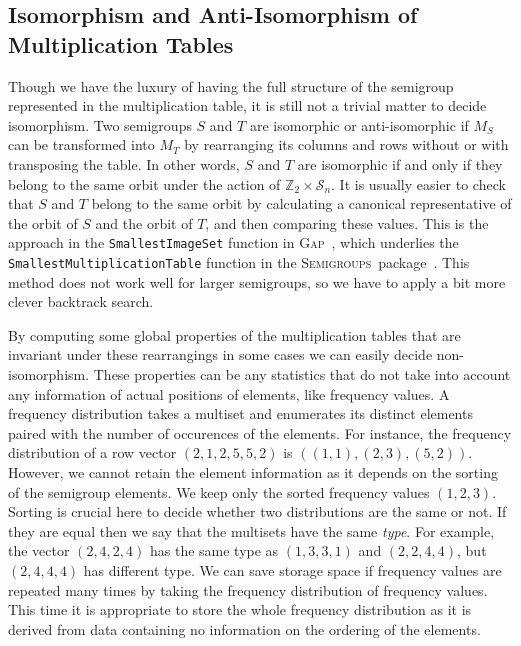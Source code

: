 \documentclass{amsart}
\newcommand{\cS}{{\mathcal S}}
\newcommand{\Z}{\mathbb{Z}}
\newcommand{\todo}[1]{\textcolor{red}{ \small \textsf{[ #1 ]} \normalsize}}
\theoremstyle{plain}
\theoremstyle{definition}
\newcommand{\GAP}{\textsc{Gap}}
\newcommand{\Semigroups}{\textsc{Semigroups}}
\begin{document}
\subsection{Isomorphism and Anti-Isomorphism of Multiplication Tables}

Though we have the luxury of having the full structure of the semigroup represented in the multiplication table, it is still not a trivial matter to decide isomorphism.
Two semigroups $S$ and $T$ are isomorphic or anti-isomorphic if $M_S$ can be transformed into $M_T$ by rearranging its columns and rows without or with transposing the table.
In other words, $S$ and $T$ are isomorphic if and only if they belong to the same orbit under the action of $\Z_2\times \cS_n$.
It is usually easier to check that $S$ and $T$ belong to the same orbit by calculating a canonical representative of the orbit of $S$ and the orbit of $T$, and then comparing these values.
This is the approach in the \texttt{SmallestImageSet} function in \GAP~\cite{GAP4}, which underlies the \texttt{SmallestMultiplicationTable} function in the \Semigroups~package~\cite{Semigroups}.
This method does not work well for larger semigroups, so we have to apply a bit more clever backtrack search.

By computing some global properties of the multiplication tables that are invariant under these rearrangings in some cases we can easily decide non-isomorphism.
These properties can be any statistics that do not take into account any information of actual positions of elements, like frequency values.
A frequency distribution takes a multiset and enumerates its distinct elements paired with the number of occurences of the elements.
For instance, the  frequency distribution of a row vector $(2,1,2,5,5,2)$ is $((1,1),(2,3),(5,2))$.
However, we cannot retain the element information as it depends on the sorting of the semigroup elements.
We keep only the sorted frequency values $(1,2,3)$.
Sorting is crucial here to decide whether two distributions are the same or not.
If they are equal then we say that the multisets have the same \emph{type}.
For example, the vector $(2,4,2,4)$ has the same type as $(1,3,3,1)$ and $(2,2,4,4)$, but $(2,4,4,4)$ has different type.
We can save storage space if frequency values are repeated many times by taking the frequency distribution of frequency values.
This time it is appropriate to store the whole frequency distribution as it is derived from data containing no information on the ordering of the elements.
\end{document}
